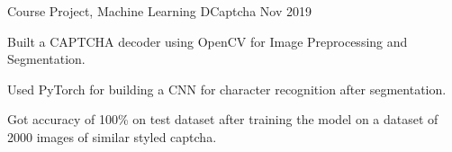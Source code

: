\begin{cventries}
{  \cventry
  {Course Project, Machine Learning}
  {DCaptcha}
  {}
  {Nov 2019}
  {
    \begin{cvitems}
      \item Built a CAPTCHA decoder using OpenCV for Image Preprocessing and Segmentation.
      \item Used PyTorch for building a CNN for character recognition after segmentation.
      \item Got accuracy of 100\% on test dataset after training the model on a dataset of 2000 images of similar styled captcha.
      \vspace{2mm}
    \end{cvitems}
  }
}
\end{cventries}

